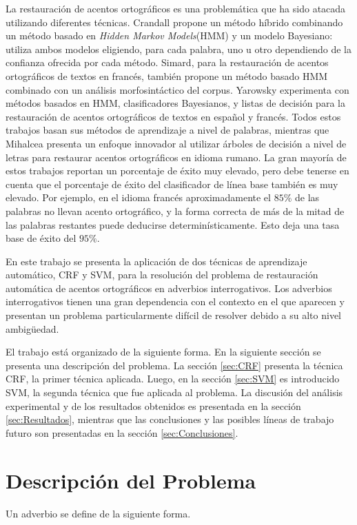 \documentclass[runningheads,a4paper]{llncs}
\begin{document}
La restauración de acentos ortográficos es una problemática que ha sido atacada utilizando diferentes técnicas. Crandall\cite{CRANDALL95} propone un método híbrido combinando un método basado en \emph{Hidden Markov Models}(HMM) y un modelo Bayesiano: utiliza ambos modelos eligiendo, para cada palabra, uno u otro dependiendo de la confianza ofrecida por cada método. Simard\cite{SIMARD98}, para la restauración de acentos ortográficos de textos en francés, también propone un método basado HMM combinado con un análisis morfosintáctico del corpus. Yarowsky\cite{YAROWSKY94,YAROWSKY94-2} experimenta con métodos basados en HMM, clasificadores Bayesianos, y listas de decisión para la restauración de acentos ortográficos de textos en español y francés. Todos estos trabajos basan sus métodos de aprendizaje a nivel de palabras, mientras que Mihalcea\cite{MIHALCEA02} presenta un enfoque innovador al utilizar árboles de decisión a nivel de letras para restaurar acentos ortográficos en idioma rumano. La gran mayoría de estos trabajos reportan un porcentaje de éxito muy elevado, pero debe tenerse en cuenta que el porcentaje de éxito del clasificador de línea base también es muy elevado. Por ejemplo, en el idioma francés aproximadamente el $85\%$ de las palabras no llevan acento ortográfico, y la forma correcta de más de la mitad de las palabras restantes puede deducirse determinísticamente. Esto deja una tasa base de éxito del $95\%$\cite{SIMARD98}.

En este trabajo se presenta la aplicación de dos técnicas de aprendizaje automático, CRF y SVM, para la resolución del problema de restauración automática de acentos ortográficos en adverbios interrogativos. Los adverbios interrogativos tienen una gran dependencia con el contexto en el que aparecen y presentan un problema particularmente difícil de resolver debido a su alto nivel ambigüedad.

El trabajo está organizado de la siguiente forma. En la siguiente sección se presenta una descripción del problema. La sección \ref{sec:CRF} presenta la técnica CRF, la primer técnica aplicada. Luego, en la sección \ref{sec:SVM} es introducido SVM, la segunda técnica que fue aplicada al problema. La discusión del análisis experimental y de los resultados obtenidos es presentada en la sección \ref{sec:Resultados}, mientras que las conclusiones y las posibles líneas de trabajo futuro son presentadas en la sección \ref{sec:Conclusiones}.

\section{Descripción del Problema}
Un adverbio se define de la siguiente forma\cite{RAE}.
\end{document}
